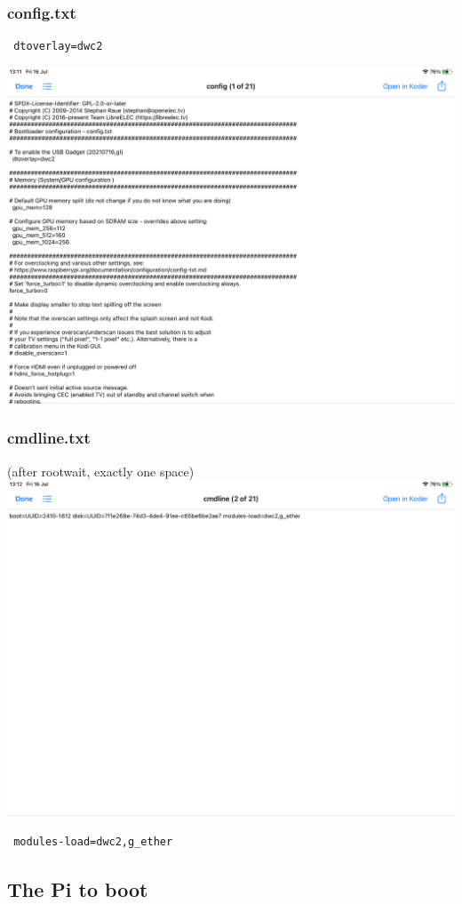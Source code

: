 \documentclass[11pt]{article}
\begin{document}
\subsubsection{config.txt}
\label{sec-1-4-1}

\begin{verbatim}
 dtoverlay=dwc2
\end{verbatim}
\includegraphics[width=.9\linewidth]{./i/8.png}
\subsubsection{cmdline.txt}
\label{sec-1-4-2}

(after rootwait, exactly one space)
\includegraphics[width=.9\linewidth]{./i/7.png}
\begin{verbatim}
 modules-load=dwc2,g_ether
\end{verbatim}
\subsection{The Pi to boot}
\label{sec-1-5}
\end{document}
